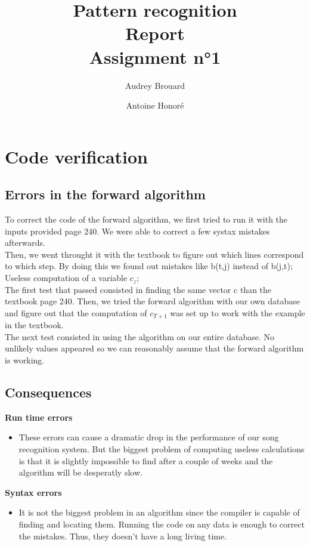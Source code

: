 \documentclass[a4paper]{report}
\title{Pattern recognition\\Report\\Assignment n°1}
\author{Audrey Brouard \and Antoine Honoré}
\newenvironment{pushright}[1]{\textbf{#1}
\begin{itemize}\item[\hspace{12pt}]}{\end{itemize}
}
\begin{document}

\section{Code verification}
\subsection{Errors in the forward algorithm}
To correct the code of the forward algorithm, we first tried to run it with the inputs provided page 240. We were able to correct a few systax mistakes afterwards.\\
Then, we went throught it with the textbook to figure out which lines correspond to which step. By doing this we found out mistakes like b(t,j) instead of b(j,t); Useless computation of a variable $c_z$;\\
The first test that passed consisted in finding the same vector c than the textbook page 240. Then, we tried the forward algorithm with our own database and figure out that the computation of $c_{T+1}$ was set up to work with the example in the textbook.\\
The next test consisted in using the algorithm on our entire database. No unlikely values  appeared so we can reasonably assume that the forward algorithm is working.\\

\subsection{Consequences}
\begin{pushright}{Run time errors}
  These errors can cause a dramatic drop in the performance of our song recognition system. But the biggest problem of computing useless calculations is that it is slightly impossible to find after a couple of weeks and the algorithm will be desperatly slow.
\end{pushright}

\begin{pushright}{Syntax errors}
  It is not the biggest problem in an algorithm since the compiler is capable of finding and locating them. Running the code on any data is enough to correct the mistakes. Thus, they doesn't have a long living time.
\end{pushright}
\end{document}
